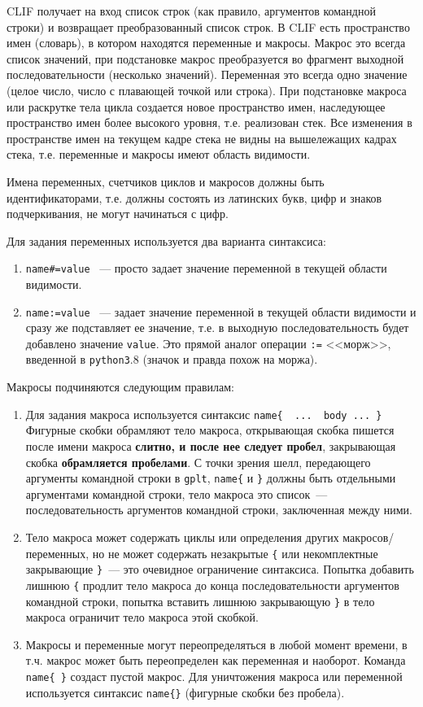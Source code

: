 \documentclass[12pt]{article}
\def\gplt{{\tt gplt}}
\def\python{{\tt python3}}
\begin{document}
CLIF получает на вход список строк (как правило, аргументов командной строки) и возвращает преобразованный список строк.
В CLIF есть пространство имен (словарь), в котором находятся переменные и макросы. Макрос это всегда список значений, при подстановке макрос
преобразуется во фрагмент выходной последовательности (несколько значений). Переменная это всегда одно значение (целое число, число с плавающей точкой или строка).
При подстановке макроса или раскрутке тела цикла создается новое пространство имен, наследующее пространство имен более высокого уровня, т.е. реализован стек.
Все изменения в пространстве имен на текущем кадре стека не видны на вышележащих кадрах стека, т.е. переменные и макросы имеют область видимости.

Имена переменных, счетчиков циклов и макросов должны быть идентификаторами,
т.е. должны состоять из латинских букв, цифр и знаков подчеркивания, не могут начинаться с цифр.

Для задания переменных используется два варианта синтаксиса:
\begin{enumerate}
\item \verb'name#=value' ~--- просто задает значение переменной в текущей области видимости.
\item \verb'name:=value' ~--- задает значение переменной в текущей области видимости и сразу же подставляет ее значение, т.е. в выходную
  последовательность будет добавлено значение \verb'value'. Это прямой аналог операции \verb':=' <<морж>>, введенной в \python.8  (значок и правда похож на моржа).
\end{enumerate}

Макросы подчиняются следующим правилам:
\begin{enumerate}
\item  Для задания макроса используется синтаксис
\verb'name{  ...  body ... }'
Фигурные скобки обрамляют тело макроса, открывающая скобка пишется после имени макроса {\bf слитно, и после нее следует пробел},
закрывающая скобка {\bf обрамляется пробелами}. С точки зрения шелл, передающего аргументы командной строки в \gplt, \verb'name{'
  и \verb'}' должны быть отдельными аргументами командной строки, тело макроса это список~--- последовательность аргументов командной строки, заключенная между ними.
\item Тело макроса может содержать циклы или определения других макросов/переменных, но не может содержать незакрытые \verb'{' или некомплектные закрывающие \verb'}'~---
это очевидное ограничение синтаксиса. Попытка добавить лишнюю \verb'{' продлит тело макроса до конца последовательности аргументов командной строки,
попытка вставить лишнюю закрывающую \verb'}' в тело макроса ограничит тело макроса этой скобкой. 
\item Макросы и переменные могут переопределяться в любой момент времени, в т.ч. макрос может быть переопределен как переменная и наоборот.
Команда \verb'name{ }' создаст пустой макрос.  Для уничтожения макроса или переменной используется синтаксис \verb'name{}' (фигурные скобки без пробела).
\end{enumerate}
\end{document}

